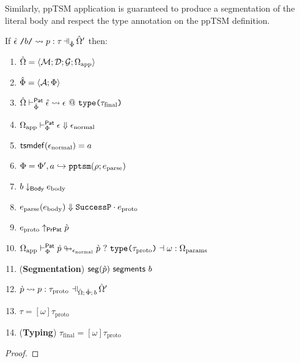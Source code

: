 Similarly, ppTSM application is guaranteed to produce a segmentation of the literal body and respect the type annotation on the ppTSM definition.
\begin{theorem}
\label{thm:pptsm-reasoning-principles}
If $\patExpandsP{\uOmega'}{\uPhi}{\utsmap{\uepsilon}{b}}{p}{\tau}$ then:
\begin{enumerate}
  \item ${\hat\Omega}=\langle \mathcal{M}; \mathcal{D}; \mathcal{G}; \Omega_\text{app} \rangle$
  \item $\hat\Phi=\langle \mathcal{A}; \Phi \rangle$
  \item ${\hat\Omega} \vdash_{\hat\Phi}^{\mathsf{Pat}} {\hat\epsilon} \leadsto \epsilon~@~\texttt{type}\texttt{(}\tau_\text{final}\texttt{)}$
  \item $\Omega_\text{app} \vdash_{\Phi}^\mathsf{Pat} \epsilon \Downarrow \epsilon_\text{normal}$
  \item $\mathsf{tsmdef}(\epsilon_\text{normal})=a$
  \item $\Phi = \Phi', a \hookrightarrow \texttt{pptsm}(\rho; e_\text{parse})$
  \item $b \downarrow_\mathsf{Body} e_\text{body}$
  \item $e_\text{parse}(e_\text{body}) \Downarrow {\mathtt{SuccessP}}\cdot{e_\text{proto}}$
  \item $e_\text{proto} \uparrow_\mathsf{PrPat} \grave{p}$
  \item $\Omega_\text{app} \vdash_{\Phi}^\mathsf{Pat} \dot{p} \looparrowright_{\epsilon_\text{normal}} \grave{p} ~?~ \texttt{type}\texttt{(}\tau_\text{proto}\texttt{)} \dashv \omega : \Omega_\text{params}$
  \item (\textbf{Segmentation}) $\mathsf{seg}(\grave{p})~\mathsf{segments}~b$
  \item $\cvalidPP{\uOmega'}{\psceneP{\uOmega}{\uPhi}{b}}{\cpv}{p}{\tau_\text{proto}}$
  \item $\tau = [\omega]\tau_\text{proto}$
  \item (\textbf{Typing}) $\tau_\text{final} = [\omega]\tau_\text{proto}$
\end{enumerate}
\end{theorem}
\begin{proof}  \end{proof}

